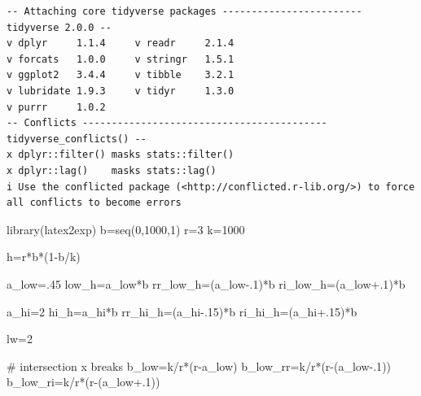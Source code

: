\documentclass[
  super,
  preprint,
  3p]{elsarticle}
\newenvironment{Shaded}{\begin{snugshade}}{\end{snugshade}}
\newcommand{\CommentTok}[1]{\textcolor[rgb]{0.37,0.37,0.37}{#1}}
\newcommand{\DecValTok}[1]{\textcolor[rgb]{0.68,0.00,0.00}{#1}}
\newcommand{\FloatTok}[1]{\textcolor[rgb]{0.68,0.00,0.00}{#1}}
\newcommand{\FunctionTok}[1]{\textcolor[rgb]{0.28,0.35,0.67}{#1}}
\newcommand{\NormalTok}[1]{\textcolor[rgb]{0.00,0.23,0.31}{#1}}
\newcommand{\OtherTok}[1]{\textcolor[rgb]{0.00,0.23,0.31}{#1}}
\newcommand{\SpecialCharTok}[1]{\textcolor[rgb]{0.37,0.37,0.37}{#1}}
\theoremstyle{plain}
\theoremstyle{plain}
\theoremstyle{remark}
\begin{document}
\begin{verbatim}
-- Attaching core tidyverse packages ------------------------ tidyverse 2.0.0 --
v dplyr     1.1.4     v readr     2.1.4
v forcats   1.0.0     v stringr   1.5.1
v ggplot2   3.4.4     v tibble    3.2.1
v lubridate 1.9.3     v tidyr     1.3.0
v purrr     1.0.2     
-- Conflicts ------------------------------------------ tidyverse_conflicts() --
x dplyr::filter() masks stats::filter()
x dplyr::lag()    masks stats::lag()
i Use the conflicted package (<http://conflicted.r-lib.org/>) to force all conflicts to become errors
\end{verbatim}

\begin{Shaded}
\begin{Highlighting}[]
\FunctionTok{library}\NormalTok{(latex2exp)}
\NormalTok{b}\OtherTok{=}\FunctionTok{seq}\NormalTok{(}\DecValTok{0}\NormalTok{,}\DecValTok{1000}\NormalTok{,}\DecValTok{1}\NormalTok{)}
\NormalTok{r}\OtherTok{=}\DecValTok{3}
\NormalTok{k}\OtherTok{=}\DecValTok{1000}

\NormalTok{h}\OtherTok{=}\NormalTok{r}\SpecialCharTok{*}\NormalTok{b}\SpecialCharTok{*}\NormalTok{(}\DecValTok{1}\SpecialCharTok{{-}}\NormalTok{b}\SpecialCharTok{/}\NormalTok{k)}

\NormalTok{a\_low}\OtherTok{=}\NormalTok{.}\DecValTok{45}
\NormalTok{low\_h}\OtherTok{=}\NormalTok{a\_low}\SpecialCharTok{*}\NormalTok{b}
\NormalTok{rr\_low\_h}\OtherTok{=}\NormalTok{(a\_low}\FloatTok{{-}.1}\NormalTok{)}\SpecialCharTok{*}\NormalTok{b}
\NormalTok{ri\_low\_h}\OtherTok{=}\NormalTok{(a\_low}\FloatTok{+.1}\NormalTok{)}\SpecialCharTok{*}\NormalTok{b}

\NormalTok{a\_hi}\OtherTok{=}\DecValTok{2}
\NormalTok{hi\_h}\OtherTok{=}\NormalTok{a\_hi}\SpecialCharTok{*}\NormalTok{b}
\NormalTok{rr\_hi\_h}\OtherTok{=}\NormalTok{(a\_hi}\FloatTok{{-}.15}\NormalTok{)}\SpecialCharTok{*}\NormalTok{b}
\NormalTok{ri\_hi\_h}\OtherTok{=}\NormalTok{(a\_hi}\FloatTok{+.15}\NormalTok{)}\SpecialCharTok{*}\NormalTok{b}

\NormalTok{lw}\OtherTok{=}\DecValTok{2}

\CommentTok{\# intersection x breaks}
\NormalTok{b\_low}\OtherTok{=}\NormalTok{k}\SpecialCharTok{/}\NormalTok{r}\SpecialCharTok{*}\NormalTok{(r}\SpecialCharTok{{-}}\NormalTok{a\_low)}
\NormalTok{b\_low\_rr}\OtherTok{=}\NormalTok{k}\SpecialCharTok{/}\NormalTok{r}\SpecialCharTok{*}\NormalTok{(r}\SpecialCharTok{{-}}\NormalTok{(a\_low}\FloatTok{{-}.1}\NormalTok{))}
\NormalTok{b\_low\_ri}\OtherTok{=}\NormalTok{k}\SpecialCharTok{/}\NormalTok{r}\SpecialCharTok{*}\NormalTok{(r}\SpecialCharTok{{-}}\NormalTok{(a\_low}\FloatTok{+.1}\NormalTok{))}


\end{Highlighting}
\end{Shaded}
\end{document}
